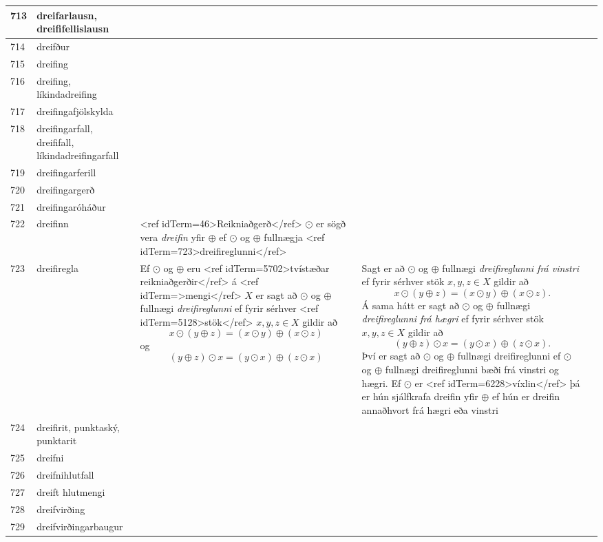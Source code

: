 \begin{longtable}{p{}|p{}|p{}|p{}|p{}}
\hline
713 & dreifarlausn, dreififellislausn &  &  &  \\
\hline
714 & dreifður &  &  &  \\
\hline
715 & dreifing &  &  &  \\
\hline
716 & dreifing, líkindadreifing &  &  &  \\
\hline
717 & dreifingafjölskylda &  &  &  \\
\hline
718 & dreifingarfall, dreififall, líkindadreifingarfall &  &  &  \\
\hline
719 & dreifingarferill &  &  &  \\
\hline
720 & dreifingargerð &  &  &  \\
\hline
721 & dreifingaróháður &  &  &  \\
\hline
722 & dreifinn & <ref idTerm=46>Reikniaðgerð</ref> $\odot$ er sögð vera \textit{dreifin} yfir $\oplus$ ef $\odot$ og $\oplus$ fullnægja <ref idTerm=723>dreifireglunni</ref> &  &  \\
\hline
723 & dreifiregla & Ef $\odot$ og $\oplus$ eru <ref idTerm=5702>tvístæðar reikniaðgerðir</ref> á <ref idTerm=>mengi</ref> $X$ er sagt að $\odot$ og $\oplus$ fullnægi \textit{dreifireglunni} ef fyrir sérhver <ref idTerm=5128>stök</ref> $x, y, z \in X$ gildir að \[ x \odot (y \oplus z) = (x \odot y) \oplus (x \odot z) \] og \[ (y \oplus z) \odot x = (y \odot x) \oplus (z \odot x) \] & Sagt er að $\odot$ og $\oplus$ fullnægi \textit{dreifireglunni frá vinstri} ef fyrir sérhver stök $x, y, z \in X$ gildir að \[ x \odot (y \oplus z) = (x \odot y) \oplus (x \odot z). \] Á sama hátt er sagt að $\odot$ og $\oplus$ fullnægi \textit{dreifireglunni frá hægri} ef fyrir sérhver stök $x, y, z \in X$ gildir að \[ (y \oplus z) \odot x = (y \odot x) \oplus (z \odot x). \] Því er sagt að $\odot$ og $\oplus$ fullnægi dreifireglunni ef $\odot$ og $\oplus$ fullnægi dreifireglunni bæði frá vinstri og hægri. Ef $\odot$ er <ref idTerm=6228>víxlin</ref> þá er hún sjálfkrafa dreifin yfir $\oplus$ ef hún er dreifin annaðhvort frá hægri eða vinstri & \\
\hline
724 & dreifirit, punktaský, punktarit &  &  &  \\
\hline
725 & dreifni &  &  &  \\
\hline
726 & dreifnihlutfall &  &  &  \\
\hline
727 & dreift hlutmengi &  &  &  \\
\hline
728 & dreifvirðing &  &  &  \\
\hline
729 & dreifvirðingarbaugur &  &  &  \\
\hline

\end{longtable}
